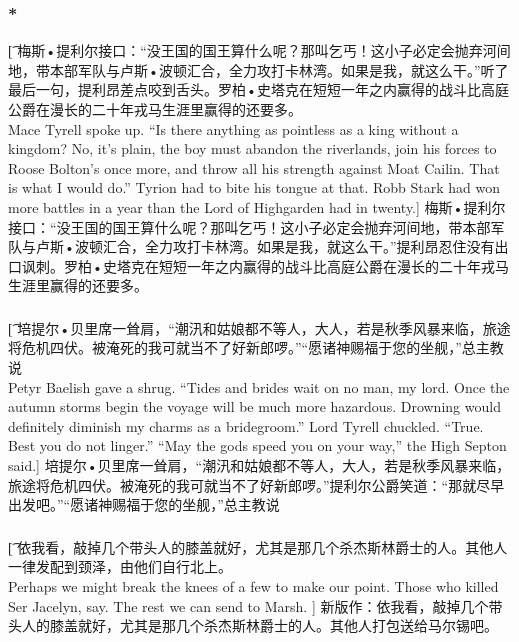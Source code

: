 \documentclass[12pt,a4paper]{article}
\begin{document}
\subsubsection{\color{red}*}\t[
	梅斯•提利尔接口：“没王国的国王算什么呢？那叫乞丐！这小子必定会抛弃河间地，带本部军队与卢斯•波顿汇合，全力攻打卡林湾。如果是我，就这么干。”听了最后一句，提利昂差点咬到舌头。罗柏•史塔克在短短一年之内赢得的战斗比高庭公爵在漫长的二十年戎马生涯里赢得的还要多。\\
	Mace Tyrell spoke up. “Is there anything as pointless as a king without a kingdom? No, it's plain, the boy must abandon the riverlands, join his forces to Roose Bolton's once more, and throw all his strength against Moat Cailin. That is what I would do.” Tyrion had to bite his tongue at that. Robb Stark had won more battles in a year than the Lord of Highgarden had in twenty.]
	梅斯•提利尔接口：“没王国的国王算什么呢？那叫乞丐！这小子必定会抛弃河间地，带本部军队与卢斯•波顿汇合，全力攻打卡林湾。如果是我，就这么干。”提利昂忍住没有出口讽刺。罗柏•史塔克在短短一年之内赢得的战斗比高庭公爵在漫长的二十年戎马生涯里赢得的还要多。
	
\subsubsection{}\t[
	培提尔•贝里席一耸肩，“潮汛和姑娘都不等人，大人，若是秋季风暴来临，旅途将危机四伏。被淹死的我可就当不了好新郎啰。”“愿诸神赐福于您的坐舰，”总主教说\\
	Petyr Baelish gave a shrug. “Tides and brides wait on no man, my lord. Once the autumn storms begin the voyage will be much more hazardous. Drowning would definitely diminish my charms as a bridegroom.” Lord Tyrell chuckled. “True. Best you do not linger.” “May the gods speed you on your way,” the High Septon said.]
	培提尔•贝里席一耸肩，“潮汛和姑娘都不等人，大人，若是秋季风暴来临，旅途将危机四伏。被淹死的我可就当不了好新郎啰。”提利尔公爵笑道：“那就尽早出发吧。”“愿诸神赐福于您的坐舰，”总主教说
	
\subsubsection{}\t[
	依我看，敲掉几个带头人的膝盖就好，尤其是那几个杀杰斯林爵士的人。其他人一律发配到颈泽，由他们自行北上。\\
	Perhaps we might break the knees of a few to make our point. Those who killed Ser Jacelyn, say. The rest we can send to Marsh. ]
	新版作：依我看，敲掉几个带头人的膝盖就好，尤其是那几个杀杰斯林爵士的人。其他人打包送给马尔锡吧。
	
\end{document}
